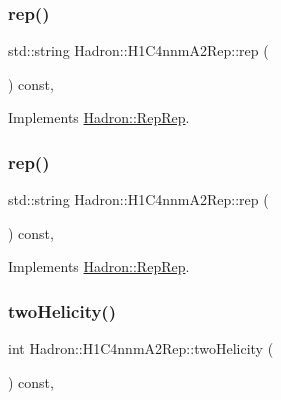 \subsubsection{\texorpdfstring{rep()}{rep()}\hspace{0.1cm}{\footnotesize\ttfamily [4/5]}}
{\footnotesize\ttfamily std\+::string Hadron\+::\+H1\+C4nnm\+A2\+Rep\+::rep (\begin{DoxyParamCaption}{ }\end{DoxyParamCaption}) const\hspace{0.3cm}{\ttfamily [inline]}, {\ttfamily [virtual]}}



Implements \mbox{\hyperlink{structHadron_1_1RepRep_ab3213025f6de249f7095892109575fde}{Hadron\+::\+Rep\+Rep}}.

\mbox{\label{structHadron_1_1H1C4nnmA2Rep_a1f403babca36b3e12ab4f6a84e0b0bfd}} 
\subsubsection{\texorpdfstring{rep()}{rep()}\hspace{0.1cm}{\footnotesize\ttfamily [5/5]}}
{\footnotesize\ttfamily std\+::string Hadron\+::\+H1\+C4nnm\+A2\+Rep\+::rep (\begin{DoxyParamCaption}{ }\end{DoxyParamCaption}) const\hspace{0.3cm}{\ttfamily [inline]}, {\ttfamily [virtual]}}



Implements \mbox{\hyperlink{structHadron_1_1RepRep_ab3213025f6de249f7095892109575fde}{Hadron\+::\+Rep\+Rep}}.

\mbox{\label{structHadron_1_1H1C4nnmA2Rep_ade831b200fa8211a8f09dd6e7e80692a}} 
\subsubsection{\texorpdfstring{twoHelicity()}{twoHelicity()}\hspace{0.1cm}{\footnotesize\ttfamily [1/3]}}
{\footnotesize\ttfamily int Hadron\+::\+H1\+C4nnm\+A2\+Rep\+::two\+Helicity (\begin{DoxyParamCaption}{ }\end{DoxyParamCaption}) const\hspace{0.3cm}{\ttfamily [inline]}, {\ttfamily [virtual]}}


